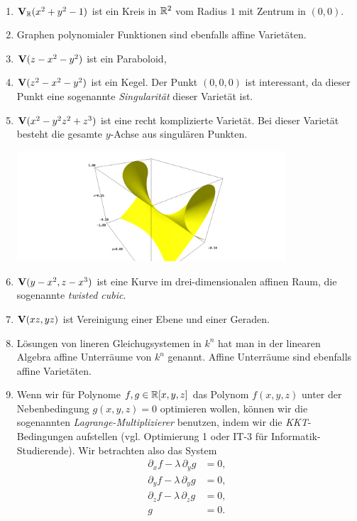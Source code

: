 \documentclass[11pt]{article}
\numberwithin{equation}{section}
\begin{document}
\begin{beispiele}{ \ } \label{bsp:var}
\begin{enumerate} 
	\item $\mathbf{V}_{\mathbb{R}}(x^2 + y^2 -1)$  ist ein Kreis in $\mathbb{R}^2$ vom Radius $1$ mit Zentrum in $(0,0)$. 
	\item Graphen polynomialer Funktionen sind ebenfalls affine Varietäten. 
	\item $\mathbf{V}(z - x^2 - y^2)$ ist ein Paraboloid, 
	\item $\mathbf{V}(z^2-x^2 - y^2)$ ist ein Kegel. Der Punkt $(0,0,0)$ ist interessant, da dieser Punkt eine sogenannte \emph{Singularität} dieser Varietät ist. 
	\item $\mathbf{V}(x^2 - y^2 z^2 + z^3)$ ist eine recht komplizierte Varietät. Bei dieser Varietät besteht die gesamte $y$-Achse aus singulären Punkten. 
	\begin{center}
		\includegraphics[width=10cm]{example_surface.png}
	\end{center}
	\item $\mathbf{V}(y-x^2, z-x^3)$ ist eine Kurve im drei-dimensionalen affinen Raum, die sogenannte \emph{twisted cubic}. 
	\item $\mathbf{V}(xz,yz)$ ist Vereinigung einer Ebene und einer Geraden. 
	\item Lösungen von lineren Gleichugsystemen in $k^n$ hat man in der linearen Algebra affine Unterräume von $k^n$ genannt. Affine Unterräume sind ebenfalls affine Varietäten. 
	\item Wenn wir für Polynome $f, g   \in \mathbb{R}[x,y,z]$ das Polynom $f(x,y,z)$ unter der Nebenbedingung $g(x,y,z)=0$ optimieren wollen, können wir die sogenannten \emph{Lagrange-Multiplizierer} benutzen, indem wir die  \emph{KKT}-Bedingungen aufstellen (vgl.  Optimierung 1 oder IT-3 für Informatik-Studierende). Wir betrachten also das System 
	\begin{align*}
		\partial_x f - \lambda \, \partial_y g & = 0, 
		\\ \partial_y f - \lambda \,\partial_y g & = 0 , 
		\\ \partial_z f - \lambda \, \partial_z g &= 0,
		\\ g & = 0. 

\end{align*}
\end{enumerate}
\end{beispiele}
\end{document}
